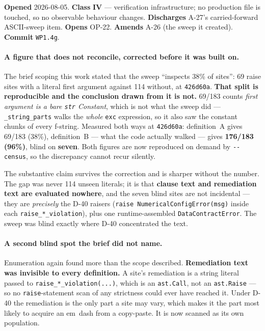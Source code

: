 \documentclass[
  10pt,
]{article}
\begin{document}
\textbf{Opened} 2026-08-05. \textbf{Class} \textbf{IV} --- verification infrastructure; no production file is touched, so no observable behaviour changes. \textbf{Discharges} A-27's carried-forward ASCII-sweep item. \textbf{Opens} OP-22. \textbf{Amends} A-26 (the sweep it created). \textbf{Commit} \texttt{WP1.4g}.

\paragraph{A figure that does not reconcile, corrected before it was built on.}
The brief scoping this work stated that the sweep ``inspects 38\% of sites'': 69 raise sites with a literal first argument against 114 without, at \texttt{426d60a}. \textbf{That split is reproducible and the conclusion drawn from it is not.} 69/183 counts \emph{first argument is a bare \texttt{str} Constant}, which is not what the sweep did --- \texttt{\_string\_parts} walks the \emph{whole} \texttt{exc} expression, so it also saw the constant chunks of every f-string. Measured both ways at \texttt{426d60a}: definition~A gives 69/183 (38\%), definition~B --- what the code actually walked --- gives \textbf{176/183 (96\%)}, blind on \textbf{seven}. Both figures are now reproduced on demand by \texttt{-{}-census}, so the discrepancy cannot recur silently.

The substantive claim survives the correction and is sharper without the number. The gap was never 114 unseen literals; it is that \textbf{clause text and remediation text are evaluated nowhere}, and the seven blind sites are not incidental --- they are \emph{precisely} the D-40 raisers (\texttt{raise NumericalConfigError(msg)} inside each \texttt{raise\_*\_violation}), plus one runtime-assembled \texttt{DataContractError}. The sweep was blind exactly where D-40 concentrated the text.

\paragraph{A second blind spot the brief did not name.}
Enumeration again found more than the scope described. \textbf{Remediation text was invisible to every definition.} A site's remediation is a string literal passed to \texttt{raise\_*\_violation(...)}, which is an \texttt{ast.Call}, not an \texttt{ast.Raise} --- so no \texttt{raise}-statement scan of any strictness could ever have reached it. Under D-40 the remediation is the only part a site may vary, which makes it the part most likely to acquire an em~dash from a copy-paste. It is now scanned as its own population.
\end{document}
